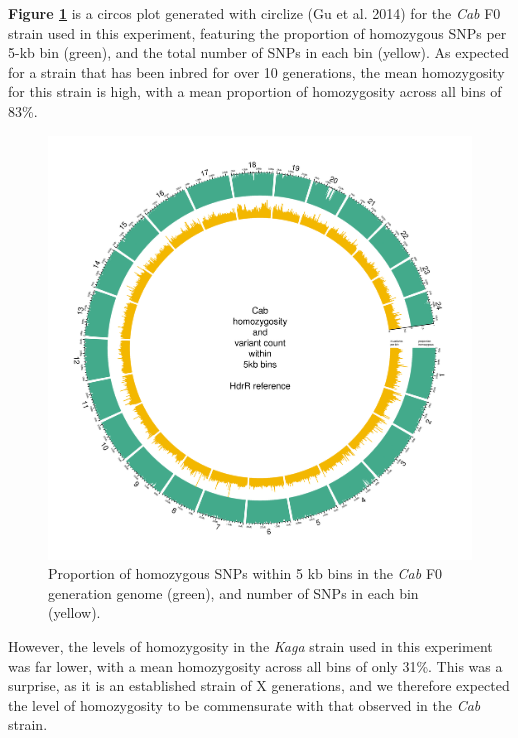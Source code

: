 \documentclass[
]{book}
\begin{document}
\textbf{Figure \ref{fig:somite-f0-cab}} is a circos plot generated with circlize (Gu et al. 2014) for the \emph{Cab} F0 strain used in this experiment, featuring the proportion of homozygous SNPs per 5-kb bin (green), and the total number of SNPs in each bin (yellow). As expected for a strain that has been inbred for over 10 generations, the mean homozygosity for this strain is high, with a mean proportion of homozygosity across all bins of 83\%.



\begin{figure}
\includegraphics[width=1\linewidth]{figs/somites/Cab} \caption{Proportion of homozygous SNPs within 5 kb bins in the \emph{Cab} F0 generation genome (green), and number of SNPs in each bin (yellow).}\label{fig:somite-f0-cab}
\end{figure}

However, the levels of homozygosity in the \emph{Kaga} strain used in this experiment was far lower, with a mean homozygosity across all bins of only 31\%. This was a surprise, as it is an established strain of X generations, and we therefore expected the level of homozygosity to be commensurate with that observed in the \emph{Cab} strain.
\end{document}

